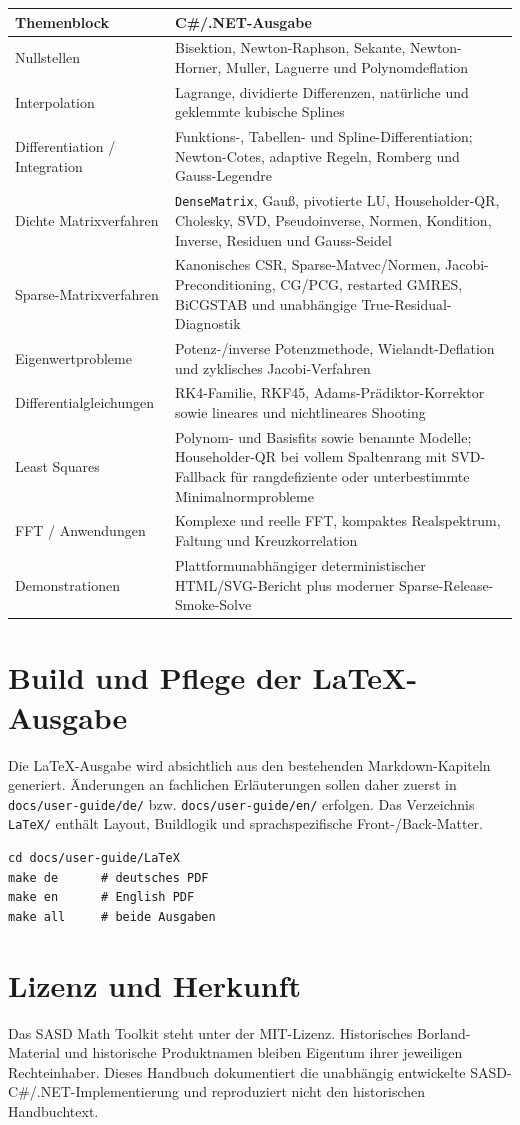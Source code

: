 \documentclass[11pt,a4paper,twoside,openright]{book}
\begin{document}
\begin{longtable}{@{}p{}p{}@{}}
\toprule
\textbf{Themenblock} & \textbf{C\#/.NET-Ausgabe}\\
\midrule
Nullstellen & Bisektion, Newton-Raphson, Sekante, Newton-Horner, Muller, Laguerre und Polynomdeflation\\
Interpolation & Lagrange, dividierte Differenzen, natürliche und geklemmte kubische Splines\\
Differentiation / Integration & Funktions-, Tabellen- und Spline-Differentiation; Newton-Cotes, adaptive Regeln, Romberg und Gauss-Legendre\\
Dichte Matrixverfahren & \texttt{DenseMatrix}, Gauß, pivotierte LU, Householder-QR, Cholesky, SVD, Pseudoinverse, Normen, Kondition, Inverse, Residuen und Gauss-Seidel\\
Sparse-Matrixverfahren & Kanonisches CSR, Sparse-Matvec/Normen, Jacobi-Preconditioning, CG/PCG, restarted GMRES, BiCGSTAB und unabhängige True-Residual-Diagnostik\\
Eigenwertprobleme & Potenz-/inverse Potenzmethode, Wielandt-Deflation und zyklisches Jacobi-Verfahren\\
Differentialgleichungen & RK4-Familie, RKF45, Adams-Prädiktor-Korrektor sowie lineares und nichtlineares Shooting\\
Least Squares & Polynom- und Basisfits sowie benannte Modelle; Householder-QR bei vollem Spaltenrang mit SVD-Fallback für rangdefiziente oder unterbestimmte Minimalnormprobleme\\
FFT / Anwendungen & Komplexe und reelle FFT, kompaktes Realspektrum, Faltung und Kreuzkorrelation\\
Demonstrationen & Plattformunabhängiger deterministischer HTML/SVG-Bericht plus moderner Sparse-Release-Smoke-Solve\\
\bottomrule
\end{longtable}

\chapter{Build und Pflege der LaTeX-Ausgabe}
Die LaTeX-Ausgabe wird absichtlich aus den bestehenden Markdown-Kapiteln generiert. Änderungen an fachlichen Erläuterungen sollen daher zuerst in \texttt{docs/user-guide/de/} bzw. \texttt{docs/user-guide/en/} erfolgen. Das Verzeichnis \texttt{LaTeX/} enthält Layout, Buildlogik und sprachspezifische Front-/Back-Matter.

\begin{lstlisting}
cd docs/user-guide/LaTeX
make de      # deutsches PDF
make en      # English PDF
make all     # beide Ausgaben
\end{lstlisting}

\backmatter
\chapter*{Lizenz und Herkunft}
Das SASD Math Toolkit steht unter der MIT-Lizenz. Historisches Borland-Material und historische Produktnamen bleiben Eigentum ihrer jeweiligen Rechteinhaber. Dieses Handbuch dokumentiert die unabhängig entwickelte SASD-C\#/.NET-Implementierung und reproduziert nicht den historischen Handbuchtext.
\end{document}

